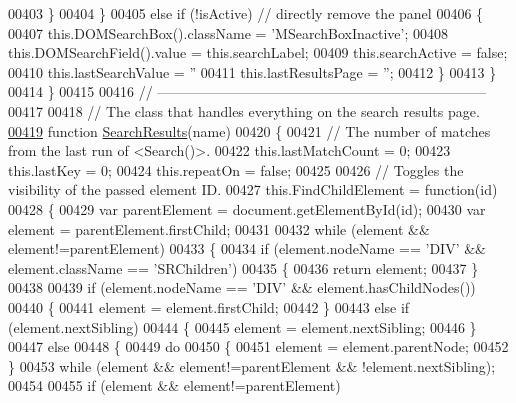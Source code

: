 \begin{DoxyCode}
00403       \}
00404     \}
00405     \textcolor{keywordflow}{else} \textcolor{keywordflow}{if} (!isActive) \textcolor{comment}{// directly remove the panel}
00406     \{
00407       this.DOMSearchBox().className = \textcolor{stringliteral}{'MSearchBoxInactive'};
00408       this.DOMSearchField().value   = this.searchLabel;
00409       this.searchActive             = \textcolor{keyword}{false};
00410       this.lastSearchValue          = \textcolor{stringliteral}{''}
00411       this.lastResultsPage          = \textcolor{stringliteral}{''};
00412     \}
00413   \}
00414 \}
00415 
00416 \textcolor{comment}{// -----------------------------------------------------------------------}
00417 
00418 \textcolor{comment}{// The class that handles everything on the search results page.}
\hypertarget{search_8js_source_l00419}{}\hyperlink{search_8js_a9189b9f7a32b6bc78240f40348f7fe03}{00419} \textcolor{keyword}{function} \hyperlink{search_8js_a9189b9f7a32b6bc78240f40348f7fe03}{SearchResults}(name)
00420 \{
00421     \textcolor{comment}{// The number of matches from the last run of <Search()>.}
00422     this.lastMatchCount = 0;
00423     this.lastKey = 0;
00424     this.repeatOn = \textcolor{keyword}{false};
00425 
00426     \textcolor{comment}{// Toggles the visibility of the passed element ID.}
00427     this.FindChildElement = \textcolor{keyword}{function}(id)
00428     \{
00429       var parentElement = document.getElementById(\textcolor{keywordtype}{id});
00430       var element = parentElement.firstChild;
00431 
00432       \textcolor{keywordflow}{while} (element && element!=parentElement)
00433       \{
00434         \textcolor{keywordflow}{if} (element.nodeName == \textcolor{stringliteral}{'DIV'} && element.className == \textcolor{stringliteral}{'SRChildren'})
00435         \{
00436           \textcolor{keywordflow}{return} element;
00437         \}
00438 
00439         \textcolor{keywordflow}{if} (element.nodeName == \textcolor{stringliteral}{'DIV'} && element.hasChildNodes())
00440         \{  
00441            element = element.firstChild;  
00442         \}
00443         \textcolor{keywordflow}{else} \textcolor{keywordflow}{if} (element.nextSibling)
00444         \{  
00445            element = element.nextSibling;  
00446         \}
00447         \textcolor{keywordflow}{else}
00448         \{
00449           \textcolor{keywordflow}{do}
00450           \{
00451             element = element.parentNode;
00452           \}
00453           \textcolor{keywordflow}{while} (element && element!=parentElement && !element.nextSibling);
00454 
00455           \textcolor{keywordflow}{if} (element && element!=parentElement)

\end{DoxyCode}
